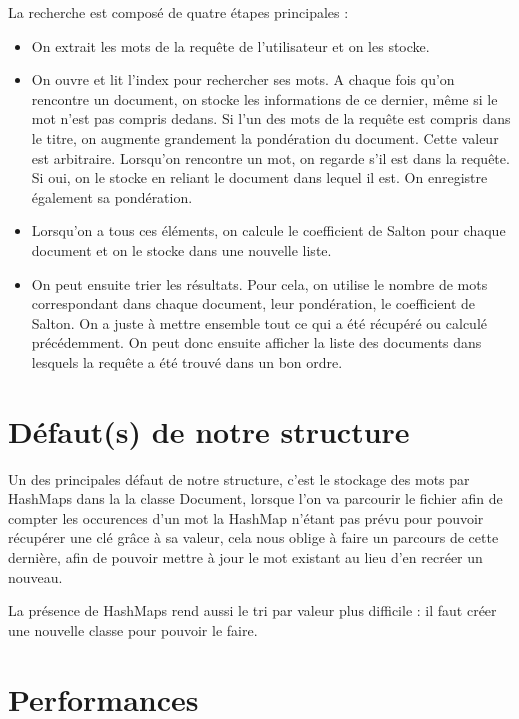 \documentclass{article}
\begin{document}
La recherche est composé de quatre étapes principales :
\begin{itemize}
     \item On extrait les mots de la requête de l'utilisateur et on les stocke.
     \item On ouvre et lit l'index pour rechercher ses mots. A chaque fois qu'on rencontre un document, on stocke les informations de ce dernier, même si le mot n'est pas compris dedans.
	  Si l'un des mots de la requête est compris dans le titre, on augmente grandement la pondération du document. Cette valeur est arbitraire.
	  Lorsqu'on rencontre un mot, on regarde s'il est dans la requête. Si oui, on le stocke en reliant le document dans lequel il est. On enregistre également sa pondération.
     \item Lorsqu'on a tous ces éléments, on calcule le coefficient de Salton pour chaque document et on le stocke dans une nouvelle liste.
     \item On peut ensuite trier les résultats. Pour cela, on utilise le nombre de mots correspondant dans chaque document, leur pondération, le coefficient de Salton. 
	  On a juste à mettre ensemble tout ce qui a été récupéré ou calculé précédemment. On peut donc ensuite afficher la liste des documents dans lesquels la requête a été trouvé dans un bon ordre.
\end{itemize}


\section{Défaut(s) de notre structure}

Un des principales défaut de notre structure, c'est le stockage des mots par HashMaps dans la
la classe Document, lorsque l'on va parcourir le fichier afin de compter les occurences d'un
mot la HashMap n'étant pas prévu pour pouvoir récupérer une clé grâce à sa valeur, cela nous
oblige à faire un parcours de cette dernière, afin de pouvoir mettre à jour le mot existant
au lieu d'en recréer un nouveau.

La présence de HashMaps rend aussi le tri par valeur plus difficile : il faut créer une nouvelle classe pour pouvoir le faire.


\section{Performances}


\end{document}
